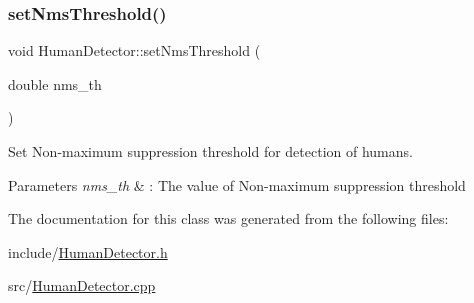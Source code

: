 \subsubsection{\texorpdfstring{set\+Nms\+Threshold()}{setNmsThreshold()}}
{\footnotesize\ttfamily void Human\+Detector\+::set\+Nms\+Threshold (\begin{DoxyParamCaption}\item[{double}]{nms\+\_\+th }\end{DoxyParamCaption})}



Set Non-\/maximum suppression threshold for detection of humans. 


\begin{DoxyParams}{Parameters}
{\em nms\+\_\+th} & \+: The value of Non-\/maximum suppression threshold \\
\hline
\end{DoxyParams}


The documentation for this class was generated from the following files\+:\begin{DoxyCompactItemize}
\item 
include/\hyperlink{HumanDetector_8h}{Human\+Detector.\+h}\item 
src/\hyperlink{HumanDetector_8cpp}{Human\+Detector.\+cpp}\end{DoxyCompactItemize}

